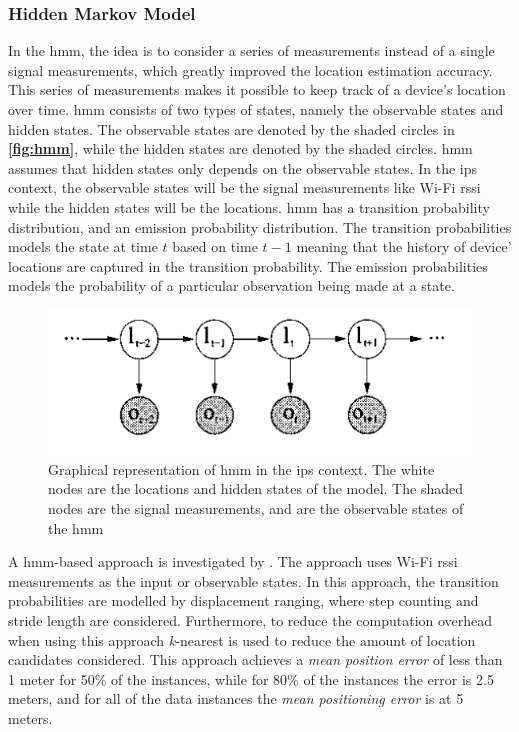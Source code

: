 \subsubsection{Hidden Markov Model}
In the \gls{hmm}, the idea is to consider a series of measurements instead of a single signal measurements, which greatly improved the location estimation accuracy. This series of measurements makes it possible to keep track of a device's location over time. \gls{hmm} consists of two types of states, namely the observable states and hidden states. The observable states are denoted by the shaded circles in \textbf{\autoref{fig:hmm}}, while the hidden states are denoted by the shaded circles. \gls{hmm} assumes that hidden states only depends on the observable states. In the \gls{ips} context, the observable states will be the signal measurements like Wi-Fi \gls{rssi} while the hidden states will be the locations. \gls{hmm} has a transition probability distribution, and an emission probability distribution. The transition probabilities models the state at time $t$ based on time $t-1$ meaning that the history of device' locations are captured in the transition probability. The emission probabilities models the probability of a particular observation being made at a state.\cite{hmmOverview}

\begin{figure}[h]
    \centering
    \includegraphics[scale=1.6]{Images/ProblemAnalysis/hmm_pe.PNG}
    \caption{Graphical representation of \gls{hmm} in the \gls{ips} context. The white nodes are the locations and hidden states of the model. The shaded nodes are the signal measurements, and are the observable states of the \gls{hmm} \cite{hmmOverview}}
    \label{fig:hmm}
\end{figure}

A \gls{hmm}-based approach is investigated by \cite{hmm01}. The approach uses Wi-Fi \gls{rssi} measurements as the input or observable states. In this approach, the transition probabilities are modelled by displacement ranging, where step counting and stride length are considered. Furthermore, to reduce the computation overhead when using this approach \textit{k}-nearest is used to reduce the amount of location candidates considered. This approach achieves a \textit{mean position error} of less than 1 meter for 50\% of the instances, while for 80\% of the instances the error is 2.5 meters, and for all of the data instances the \textit{mean positioning error} is at 5 meters.

